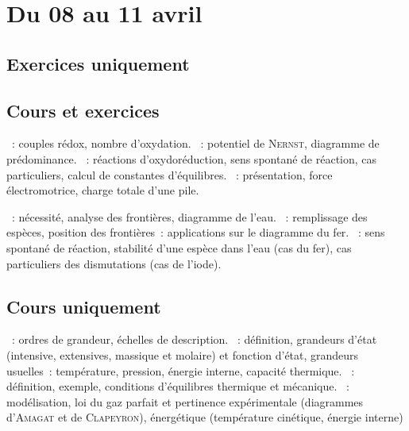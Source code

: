 \documentclass[a4paper, 11pt, final, garamond]{book}
\begin{document}
\setcounter{chapter}{23}

\chapter{Du 08 au 11 avril}

\section{Exercices uniquement}

\section{Cours et exercices}
\begin{enumerate}[label=\Roman*]
	~: couples rédox, nombre d'oxydation.
	~: potentiel de \textsc{Nernst},
	diagramme de prédominance.
	~: réactions d'oxydoréduction, sens spontané de
	réaction, cas particuliers, calcul de constantes d'équilibres.
	~: présentation, force électromotrice, charge
	totale d'une pile.
\end{enumerate}

\begin{enumerate}[label=\Roman*]
	~: nécessité, analyse des frontières, diagramme de l'eau.
	~: remplissage des espèces, position des
	frontières~: applications sur le diagramme du fer.
	~: sens spontané de réaction, stabilité d'une espèce dans
	l'eau (cas du fer), cas particuliers des dismutations (cas de l'iode).
\end{enumerate}

\section{Cours uniquement}
\begin{enumerate}[label=\Roman*]
	~: ordres de grandeur, échelles de description.
	~: définition, grandeurs d'état (intensive, extensives,
	massique et molaire) et fonction d'état, grandeurs usuelles~: température,
	pression, énergie interne, capacité thermique.
	~: définition, exemple, conditions
	d'équilibres thermique et mécanique.
	~: modélisation, loi du gaz parfait et pertinence
	expérimentale (diagrammes d'\textsc{Amagat} et de \textsc{Clapeyron}),
	énergétique (température cinétique, énergie interne)
\end{enumerate}
\end{document}
